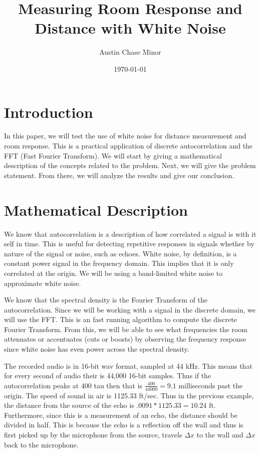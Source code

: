 \documentclass{article}
\author{Austin Chase Minor}
\title{Measuring Room Response and Distance with White Noise}
\date{\today}
\begin{document}
   \maketitle
   \section{Introduction}
      In this paper, we will test the use of
      white noise for distance measurement and
      room response. This is a practical application
      of discrete autocorrelation and the FFT
      (Fast Fourier Transform). We will start by
      giving a mathematical description of the concepts related
      to the problem. Next, we will give the problem statement.
      From there, we will analyze the results and give our
      conclusion.
   \section{Mathematical Description}
      We know that autocorrelation is a description of
      how correlated a signal is with it self in time.
      This is useful for detecting repetitive responses
      in signals whether by nature of the signal or noise,
      such as echoes. White noise, by definition, is a constant
      power signal in the frequency domain. This implies that it
      is only correlated at the origin. We will be using a band-limited
      white noise to approximate white noise.

      We know that the spectral density is the Fourier Transform of
      the autocorrelation. Since we will be working with a signal in the
      discrete domain, we will use the FFT. This is an fast running
      algorithm to compute the discrete Fourier Transform. From this, we will
      be able to see what frequencies 
      the room attenuates or accentuates (cuts or boosts)
      by observing the frequency response since white noise has
      even power across the spectral density.

      The recorded audio is in 16-bit wav format, sampled at 44 kHz.
      This means that for every second of audio their is 44,000 16-bit
      samples. Thus if the autocorrelation peaks at 400 tau then
      that is $\frac{400}{44000} = 9.1$ milliseconds past the origin.
      The speed of sound in air is 1125.33 ft/sec. Thus in the previous
      example, the distance from the source
      of the echo is $.0091*1125.33 = 10.24$ ft. Furthermore, since this
      is a measurement of an echo, the distance should be divided in half.
      This is because the echo is a reflection off the wall and thus is first
      picked up by the microphone from the source, travels $\Delta x$ to the
      wall and $\Delta x$ back to the microphone.
\end{document}
